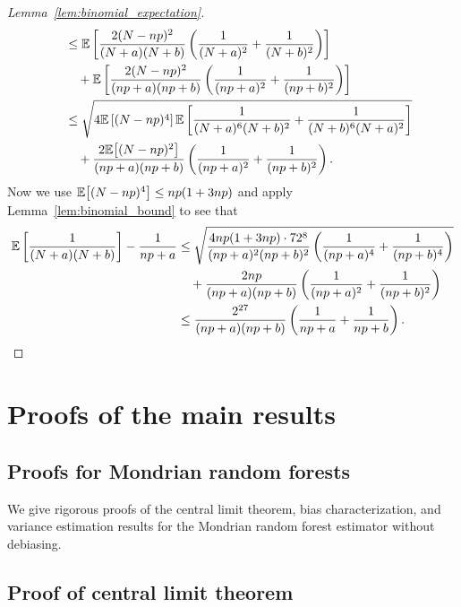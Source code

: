 \begin{proof}[Lemma~\ref{lem:binomial_expectation}]
\begin{align*}
    &\quad\leq
    \mathbb{E} \left[
      \frac{2 (N - n p)^2}{(N+a)(N+b)}
      \left(
        \frac{1}{(N + a)^2}
        + \frac{1}{(N + b)^2}
      \right)
    \right] \\
    &\qquad+
    \mathbb{E} \left[
      \frac{2 (N - n p)^2}{(n p +a)(n p +b)}
      \left(
        \frac{1}{(n p + a)^2}
        + \frac{1}{(n p + b)^2}
      \right)
    \right] \\
    &\quad\leq
    \sqrt{
      4 \mathbb{E} \left[ (N - n p)^4 \right]
      \mathbb{E} \left[
        \frac{1}{(N + a)^6 (N+b)^2}
        + \frac{1}{(N + b)^6 (N+a)^2}
    \right]} \\
    &\qquad+
    \frac{2 \mathbb{E}\big[(N - n p)^2\big]}{(n p +a)(n p +b)}
    \left(
      \frac{1}{(n p + a)^2}
      + \frac{1}{(n p + b)^2}
    \right).
  \end{align*}
  Now we use
  $\mathbb{E}\big[(N - n p)^4\big] \leq n p(1+3n p)$
  and apply Lemma~\ref{lem:binomial_bound} to see that
  \begin{align*}
    \mathbb{E} \left[
      \frac{1}{(N+a)(N+b)}
    \right]
    - \frac{1}{n p+a}
    &\leq
    \sqrt{
      \frac{4n p (1 + 3n p) \cdot 72^8}{(n p + a)^2 (n p + b)^2}
      \left(
        \frac{1}{(n p + a)^4}
        + \frac{1}{(n p + b)^4}
    \right)} \\
    &\quad+
    \frac{2 n p}{(n p +a)(n p +b)}
    \left(
      \frac{1}{(n p + a)^2}
      + \frac{1}{(n p + b)^2}
    \right) \\
    &\leq
    \frac{2^{27}}{(n p + a) (n p + b)}
    \left(
      \frac{1}{n p + a}
      + \frac{1}{n p + b}
    \right).
  \end{align*}
\end{proof}

\section{Proofs of the main results}
\label{sec:mondrian_proofs}

\subsection{Proofs for Mondrian random forests}

We give rigorous proofs of the central limit theorem,
bias characterization, and variance estimation
results for the Mondrian random forest estimator without debiasing.

\subsection*{Proof of central limit theorem}

